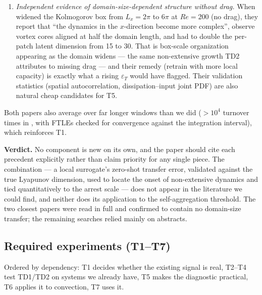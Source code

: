 \documentclass[11pt]{article}
\begin{document}
\begin{enumerate}[nosep]
\item \emph{Independent evidence of domain-size-dependent structure
  without drag.} When \cite{constanteamores2024} widened the Kolmogorov
  box from $L_x{=}2\pi$ to $6\pi$ at $Re{=}200$ (no drag), they report that
  ``the dynamics in the $x$-direction become more complex'', observe
  vortex cores aligned at half the domain length, and had to double the
  per-patch latent dimension from 15 to 30. That is box-scale
  organization appearing as the domain widens --- the same non-extensive
  growth TD2 attributes to missing drag --- and their remedy (retrain with
  more local capacity) is exactly what a rising $\varepsilon_T$ would
  have flagged. Their validation statistics (spatial autocorrelation,
  dissipation--input joint PDF) are also natural cheap candidates for T5.
\end{enumerate}
Both papers also average over far longer windows than we did
($>10^4$ turnover times in \cite{kolmogorovregimes2026}, with FTLEs
checked for convergence against the integration interval), which
reinforces T1.

\textbf{Verdict.} No component is new on its own, and the paper should
cite each precedent explicitly rather than claim priority for any
single piece. The combination --- a local surrogate's zero-shot transfer
error, validated against the true Lyapunov dimension, used to locate the
onset of non-extensive dynamics and tied quantitatively to the arrest
scale --- does not appear in the literature we could find, and neither
does its application to the self-aggregation threshold. The two closest
papers \cite{constanteamores2024,kolmogorovregimes2026} were read in
full and confirmed to contain no domain-size transfer; the remaining
searches relied mainly on abstracts.

\subsection{Required experiments (T1--T7)}
\label{sec:td_experiments}

Ordered by dependency: T1 decides whether the existing signal is real,
T2--T4 test TD1/TD2 on systems we already have, T5 makes the diagnostic
practical, T6 applies it to convection, T7 uses it.
\end{document}
